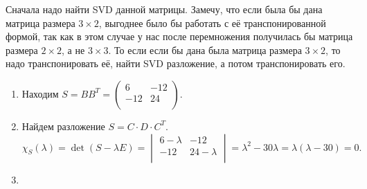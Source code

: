 \documentclass[a4paper]{article}
\begin{document}
    \begin{solution}
        Сначала надо найти SVD данной матрицы. Замечу, что если была бы дана матрица размера $3 \times 2$, выгоднее было бы работать с её транспонированной формой, так как в этом случае у нас после перемножения получилась бы матрица размера $2 \times 2$, а не $3 \times 3$. То если если бы дана была матрица размера $3 \times 2$, то надо транспонировать её, найти SVD разложение, а потом транспонировать его.

        \begin{enumerate}
        \item 
            Находим $S = BB^T = \begin{pmatrix}
                6 & -12 \\
                -12 & 24 \\
            \end{pmatrix}$.

        \item 
            Найдем разложение $S = C \cdot D \cdot C^T$. 
            \begin{equation*}
                \chi_S(\lambda) = \det(S - \lambda E) 
                = \begin{vmatrix}
                    6 - \lambda & -12 \\
                    -12 & 24 - \lambda \\
                \end{vmatrix}
                = \lambda^2 - 30\lambda = \lambda(\lambda - 30) = 0.
            \end{equation*}
        
        \item 
\end{enumerate}
\end{solution}
\end{document}
